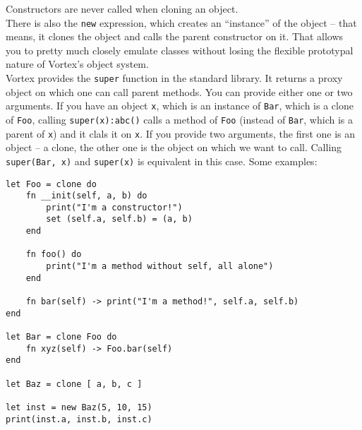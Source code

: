 \documentclass{article}
\begin{document}
Constructors are never called when cloning an object.\\
There is also the \verb|new| expression, which creates an \enquote{instance}
of the object -- that means, it clones the object and calls the parent
constructor on it. That allows you to pretty much closely emulate classes
without losing the flexible prototypal nature of Vortex's object system.\\
Vortex provides the \verb|super| function in the standard library. It returns
a proxy object on which one can call parent methods. You can provide either
one or two arguments. If you have an object \verb|x|, which is an instance of
\verb|Bar|, which is a clone of \verb|Foo|, calling \verb|super(x):abc()|
calls a method of \verb|Foo| (instead of \verb|Bar|, which is a parent of
\verb|x|) and it clals it on \verb|x|. If you provide two arguments, the
first one is an object -- a clone, the other one is the object on which
we want to call. Calling \verb|super(Bar, x)| and \verb|super(x)| is equivalent
in this case.
Some examples:
\begin{lstlisting}[language=vortex]
let Foo = clone do
    fn __init(self, a, b) do
        print("I'm a constructor!")
        set (self.a, self.b) = (a, b)
    end

    fn foo() do
        print("I'm a method without self, all alone")
    end

    fn bar(self) -> print("I'm a method!", self.a, self.b)
end

let Bar = clone Foo do
    fn xyz(self) -> Foo.bar(self)
end

let Baz = clone [ a, b, c ]

let inst = new Baz(5, 10, 15)
print(inst.a, inst.b, inst.c)
\end{lstlisting}
\end{document}
